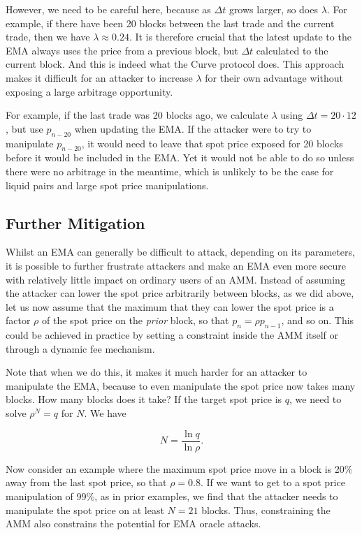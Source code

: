 \documentclass[bibliography=numbered]{article}
\begin{document}
However, we need to be careful here, because as $\Delta t$ grows larger, so does $\lambda$. For example, if there have been 20 blocks between the last trade and the current trade, then we have $\lambda \approx 0.24$. It is therefore crucial that the latest update to the EMA always uses the price from a previous block, but $\Delta t$ calculated to the current block. And this is indeed what the Curve protocol does. This approach makes it difficult for an attacker to increase $\lambda$ for their own advantage without exposing a large arbitrage opportunity. 

For example, if the last trade was 20 blocks ago, we calculate $\lambda$ using $\Delta t = 20 \cdot 12$, but use $p_{n-20}$ when updating the EMA. If the attacker were to try to manipulate $p_{n - 20}$, it would need to leave that spot price exposed for 20 blocks before it would be included in the EMA. Yet it would not be able to do so unless there were no arbitrage in the meantime, which is unlikely to be the case for liquid pairs and large spot price manipulations. 

\subsection{Further Mitigation}

Whilst an EMA can generally be difficult to attack, depending on its parameters, it is possible to further frustrate attackers and make an EMA even more secure with relatively little impact on ordinary users of an AMM. Instead of assuming the attacker can lower the spot price arbitrarily between blocks, as we did above, let us now assume that the maximum that they can lower the spot price is a factor $\rho$ of the spot price on the \textit{prior} block, so that $p_{n} = \rho p_{n - 1}$, and so on. This could be achieved in practice by setting a constraint inside the AMM itself or through a dynamic fee mechanism. 

Note that when we do this, it makes it much harder for an attacker to manipulate the EMA, because to even manipulate the spot price now takes many blocks. How many blocks does it take? If the target spot price is $q$, we need to solve $\rho^{N} = q$ for $N$. We have

\begin{equation}
    N = \frac{\ln{q}}{\ln{\rho}}.
\end{equation}

Now consider an example where the maximum spot price move in a block is 20\% away from the last spot price, so that $\rho = 0.8$. If we want to get to a spot price manipulation of 99\%, as in prior examples, we find that the attacker needs to manipulate the spot price on at least $N = 21$ blocks. Thus, constraining the AMM also constrains the potential for EMA oracle attacks.
\end{document}
